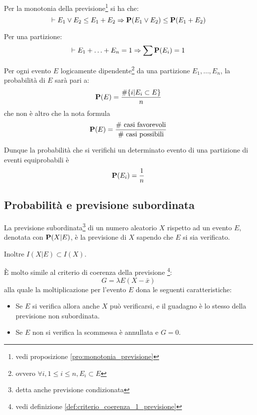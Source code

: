 Per la monotonia della previsione\footnote{vedi proposizione \ref{pro:monotonia_previsione}} si ha che:
\[ \vdash E_1 \vee E_2 \le E_1 + E_2 \Rightarrow \mathbf{P}(E_1 \vee E_2) \le \mathbf{P}(E_1 + E_2) \]

Per una partizione: %
\[ \vdash E_1 + \ldots + E_n = 1 \Rightarrow \sum \mathbf{P}(E_i) = 1 \]

\begin{proposition}
  Per ogni evento $E$ logicamente dipendente\footnote{ovvero \( \forall i, 1 \le i \le n, E_i \subset E \)} da una partizione \( E_1, \ldots, E_n \), la probabilità di $E$ sarà pari a:
  \[ \mathbf{P}(E) = \frac{\#\{i|E_i \subset E\}}{n} \]
  che non è altro che la nota formula
  \[ \mathbf{P}(E) = \frac{\text{\# casi favorevoli}}{\text{\# casi possibili}} \]
\end{proposition}

Dunque la probabilità che si verifichi un determinato evento di una partizione di eventi equiprobabili è
\[ \mathbf{P}(E_i) = \frac{1}{n} \]


\subsection{Probabilità e previsione subordinata} %
\begin{definition}
  La previsione subordinata\footnote{detta anche previsione condizionata} di un numero aleatorio $X$ rispetto ad un evento $E$, denotata con \( \mathbf{P}(X|E) \), è la previsione di $X$ sapendo che $E$ si sia verificato.
\end{definition}

Inoltre \( I(X|E) \subset I(X) \).

\begin{definition}
  \label{def:criterio_coerenza_1_probabilita}
  È molto simile al criterio di coerenza della previsione
  \footnote{vedi definizione \ref{def:criterio_coerenza_1_previsione}}:
  \[ G = \lambda E (X - \bar{x}) \]
  alla quale la moltiplicazione per l'evento $E$ dona le seguenti caratteristiche:
  \begin{itemize}
  \item Se $E$ si verifica allora anche $X$ può verificarsi, e il guadagno è lo stesso della previsione non subordinata.
  \item Se $E$ non si verifica la scommessa è annullata e \( G = 0 \).
  \end{itemize}
\end{definition}

